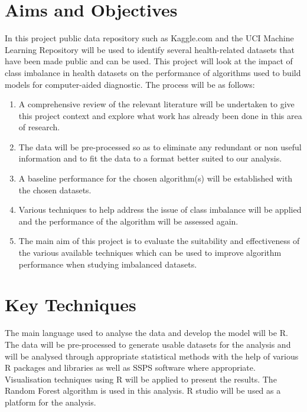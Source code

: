 \section{Aims and Objectives}
In this project public data repository such as Kaggle.com and the UCI Machine Learning Repository will be used to identify several health-related datasets that have been made public and can be used. This project will look at the impact of class imbalance in health datasets on the performance of algorithms used to build models for computer-aided diagnostic. The process will be as follows:
\begin{enumerate}
    \item A comprehensive review of the relevant literature will be undertaken to give this project context and explore what work has already been done in this area of research.
    
    \item The data will be pre-processed so as to eliminate any redundant or non useful information and to fit the data to a format better suited to our analysis.
    
    \item A baseline performance for the chosen algorithm(s) will be established with the chosen datasets.
    
    \item Various techniques to help address the issue of class imbalance will be applied and the performance of the algorithm will be assessed again.
    
    \item The main aim of this project is to evaluate the suitability and effectiveness of the various available techniques which can be used to improve algorithm performance when studying imbalanced datasets.
  
\end{enumerate}

\section{Key Techniques}
The main language used to analyse the data and develop the model will be R.
The data will be pre-processed to generate usable datasets for the analysis and will be analysed through appropriate statistical methods with the help of various R packages and libraries as well as SSPS software where appropriate.
Visualisation techniques using R will be applied to present the results. The Random Forest algorithm is used in this analysis. 
R studio will be used as a platform for the analysis.

